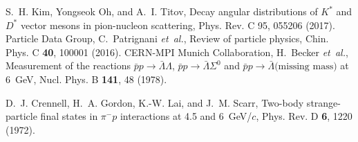 \documentclass[a4paper,12pt]{article}
\begin{document}
\begin{thebibliography}{99}
S.~H. Kim, Yongseok Oh, and A.~I. Titov,
Decay angular distributions of $K^*$ and $D^*$ vector mesons in pion-nucleon scattering,
\newblock Phys. Rev. C 95, 055206 (2017).
%
Particle Data Group, C.~Patrignani \textit{et~al.\/},
\newblock Review of particle physics,
\newblock Chin. Phys. C \textbf{40}, 100001 (2016).
CERN-MPI Munich Collaboration, H.~Becker \textit{et~al.\/},
\newblock Measurement of the reactions $\bar{p}p \to \bar{\Lambda} \Lambda$,
  $\bar{p}p \to \bar{\Lambda} \Sigma^0$ and $\bar{p} p \to \bar{\Lambda}
  \mbox{(missing mass)}$ at 6~GeV,
\newblock Nucl. Phys. B \textbf{141}, 48 (1978).

D.~J. Crennell, H.~A. Gordon, K.-W. Lai, and J.~M. Scarr,
\newblock Two-body strange-particle final states in $\pi^- p$ interactions at
  4.5 and 6~GeV/$c$,
\newblock Phys. Rev. D \textbf{6}, 1220 (1972).

\end{thebibliography}
\end{document}
